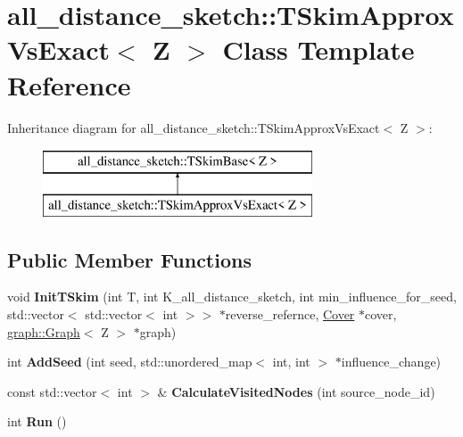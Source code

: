 \hypertarget{classall__distance__sketch_1_1TSkimApproxVsExact}{}\section{all\+\_\+distance\+\_\+sketch\+:\+:T\+Skim\+Approx\+Vs\+Exact$<$ Z $>$ Class Template Reference}
\label{classall__distance__sketch_1_1TSkimApproxVsExact}
Inheritance diagram for all\+\_\+distance\+\_\+sketch\+:\+:T\+Skim\+Approx\+Vs\+Exact$<$ Z $>$\+:\begin{figure}[H]
\begin{center}
\leavevmode
\includegraphics[height=2.000000cm]{classall__distance__sketch_1_1TSkimApproxVsExact}
\end{center}
\end{figure}
\subsection*{Public Member Functions}
\begin{DoxyCompactItemize}
\item 
\hypertarget{classall__distance__sketch_1_1TSkimApproxVsExact_afdaa3437c45eba8582c3068bccda5333}{}void {\bfseries Init\+T\+Skim} (int T, int K\+\_\+all\+\_\+distance\+\_\+sketch, int min\+\_\+influence\+\_\+for\+\_\+seed, std\+::vector$<$ std\+::vector$<$ int $>$$>$ $\ast$reverse\+\_\+refernce, \hyperlink{classall__distance__sketch_1_1Cover}{Cover} $\ast$cover, \hyperlink{classall__distance__sketch_1_1graph_1_1Graph}{graph\+::\+Graph}$<$ Z $>$ $\ast$graph)\label{classall__distance__sketch_1_1TSkimApproxVsExact_afdaa3437c45eba8582c3068bccda5333}

\item 
\hypertarget{classall__distance__sketch_1_1TSkimApproxVsExact_aa738028e959df35bbb9c842cc735e64f}{}int {\bfseries Add\+Seed} (int seed, std\+::unordered\+\_\+map$<$ int, int $>$ $\ast$influence\+\_\+change)\label{classall__distance__sketch_1_1TSkimApproxVsExact_aa738028e959df35bbb9c842cc735e64f}

\item 
\hypertarget{classall__distance__sketch_1_1TSkimApproxVsExact_a0fbe7d85483fa04058e3478d219948ef}{}const std\+::vector$<$ int $>$ \& {\bfseries Calculate\+Visited\+Nodes} (int source\+\_\+node\+\_\+id)\label{classall__distance__sketch_1_1TSkimApproxVsExact_a0fbe7d85483fa04058e3478d219948ef}

\item 
\hypertarget{classall__distance__sketch_1_1TSkimApproxVsExact_acdaaf30cff9c49fec9892f73488edc80}{}int {\bfseries Run} ()\label{classall__distance__sketch_1_1TSkimApproxVsExact_acdaaf30cff9c49fec9892f73488edc80}

\end{DoxyCompactItemize}
